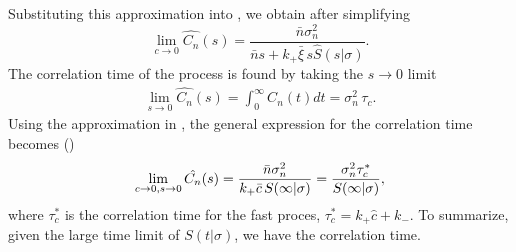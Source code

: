Substituting this approximation into , we obtain after simplifying
\begin{equation}
 \lim_{c \to 0} \hat{C_n}(s) = \frac{\bar{n} \sigma_n^2}{\bar{n} s + k_+ \bar{\xi} \, s \hat{S}(s|\sigma)}.
\end{equation}
The correlation time of the process is found by taking the $s \to 0$ limit
\begin{eqnarray}
 \lim_{s \to 0} \hat{C_n}(s) = \int_0^\infty C_n(t) dt = \sigma_n^2 \, \tau_c.
\end{eqnarray}
Using the approximation in , the general expression for the correlation time becomes ()
\begin{equation}
 \lim_{c \to 0, s \to 0} \hat{C_n}(s) = \frac{\bar{n} \sigma_n^2}{k_+ \bar{c} \, S(\infty|\sigma)} = \frac{\sigma_n^2 \tau_c^*}{S(\infty|\sigma)},
 \elabel{CT1}
\end{equation}
where $\tau_c^*$ is the correlation time for the fast proces, $\tau_c^* = k_+ \hat{c} + k_-$. To summarize, given the large time limit of $S(t|\sigma)$, we have the correlation time.


